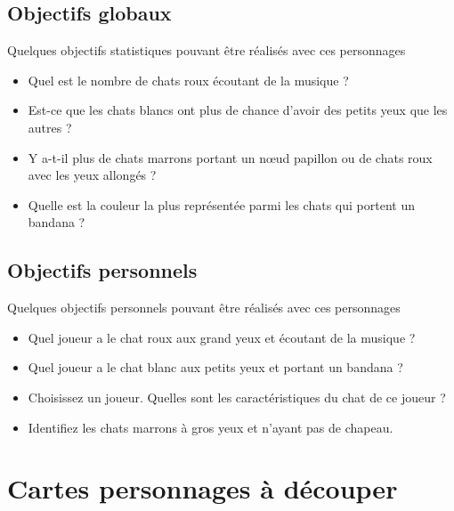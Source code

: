 \documentclass[a4paper, 12pt]{article}
\begin{document}
\subsection*{Objectifs globaux}
Quelques objectifs statistiques pouvant être réalisés avec ces personnages

\begin{itemize}

\item Quel est le nombre de chats roux écoutant de la musique ?
\item Est-ce que les chats blancs ont plus de chance d'avoir des petits yeux que les autres ?
\item Y a-t-il plus de chats marrons portant un nœud papillon ou de chats roux avec les yeux allongés ?
\item Quelle est la couleur la plus représentée parmi les chats qui portent un bandana ?

\end{itemize}

\subsection*{Objectifs personnels}
Quelques objectifs personnels pouvant être réalisés avec ces personnages

\begin{itemize}

\item Quel joueur a le chat roux aux grand yeux et écoutant de la musique ?
\item Quel joueur a le chat blanc aux petits yeux et portant un bandana ?
\item Choisissez un joueur. Quelles sont les caractéristiques du chat de ce joueur ?
\item Identifiez les chats marrons à gros yeux et n'ayant pas de chapeau.

\end{itemize}







\newpage

\section*{Cartes personnages à découper}
\end{document}
